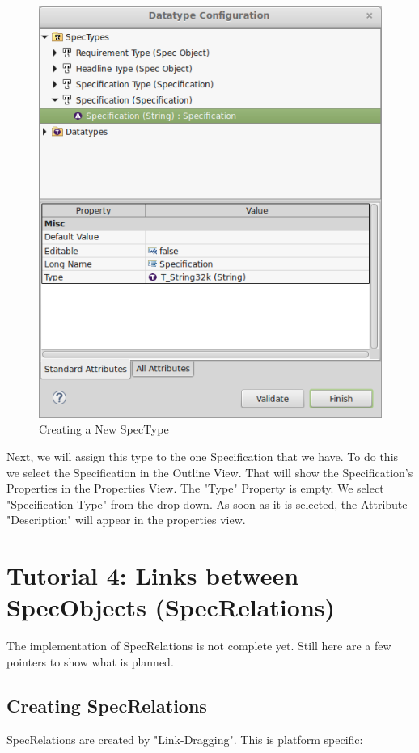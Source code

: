 \begin{figure}[h!]
\centering      
\includegraphics[width=0.8\linewidth]{../rmf-images/new_spectype.png}      
\caption{Creating a New SpecType}      
\label{fig:newSpecType}
\end{figure}

Next, we will assign this type to the one Specification that we have.  To do this we select the Specification in the Outline View.  That will show
the Specification's Properties in the Properties View.  The "Type" Property is empty.  We select "Specification Type" from the drop down.
As soon as it is selected, the Attribute "Description" will appear in the properties view.

\section{Tutorial 4: Links between SpecObjects (SpecRelations)}

The implementation of SpecRelations is not complete yet.  Still here are a few pointers to show what is planned.

\subsection{Creating SpecRelations}

SpecRelations are created by "Link-Dragging".  This is platform specific:

